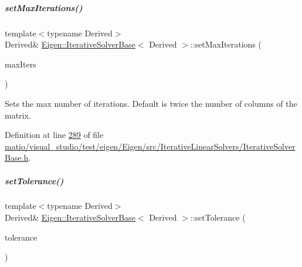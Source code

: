 \mbox{\label{group___iterative_linear_solvers___module_af83de7a7d31d9d4bd1fef6222b07335b}} 
\subparagraph{\texorpdfstring{set\+Max\+Iterations()}{setMaxIterations()}\hspace{0.1cm}{\footnotesize\ttfamily [2/2]}}
{\footnotesize\ttfamily template$<$typename Derived$>$ \\
Derived\& \hyperlink{group___iterative_linear_solvers___module_class_eigen_1_1_iterative_solver_base}{Eigen\+::\+Iterative\+Solver\+Base}$<$ Derived $>$\+::set\+Max\+Iterations (\begin{DoxyParamCaption}\item[{\hyperlink{namespace_eigen_a62e77e0933482dafde8fe197d9a2cfde}{Index}}]{max\+Iters }\end{DoxyParamCaption})\hspace{0.3cm}{\ttfamily [inline]}}

Sets the max number of iterations. Default is twice the number of columns of the matrix. 

Definition at line \hyperlink{matio_2visual__studio_2test_2eigen_2_eigen_2src_2_iterative_linear_solvers_2_iterative_solver_base_8h_source_l00289}{289} of file \hyperlink{matio_2visual__studio_2test_2eigen_2_eigen_2src_2_iterative_linear_solvers_2_iterative_solver_base_8h_source}{matio/visual\+\_\+studio/test/eigen/\+Eigen/src/\+Iterative\+Linear\+Solvers/\+Iterative\+Solver\+Base.\+h}.

\mbox{\label{group___iterative_linear_solvers___module_ac160a444af8998f93da9aa30e858470d}} 
\subparagraph{\texorpdfstring{set\+Tolerance()}{setTolerance()}\hspace{0.1cm}{\footnotesize\ttfamily [1/2]}}
{\footnotesize\ttfamily template$<$typename Derived$>$ \\
Derived\& \hyperlink{group___iterative_linear_solvers___module_class_eigen_1_1_iterative_solver_base}{Eigen\+::\+Iterative\+Solver\+Base}$<$ Derived $>$\+::set\+Tolerance (\begin{DoxyParamCaption}\item[{const Real\+Scalar \&}]{tolerance }\end{DoxyParamCaption})\hspace{0.3cm}{\ttfamily [inline]}}


